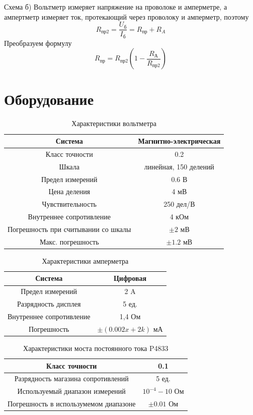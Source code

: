 \documentclass[a4paper,12pt]{article}
\begin{document}
Схема б) Вольтметр измеряет напряжение на проволоке и амперметре, а ампертметр измеряет ток, протекающий через проволоку и амперметр, поэтому
\begin{equation}
R_{\mbox{пр2}}=\frac{U_{\mbox{б}}}{I_{\mbox{б}}} = R_{\mbox{пр}}+R_A
\end{equation}
Преобразуем формулу
\begin{equation}
R_{\mbox{пр}}=R_{\mbox{пр2}} \left( 1-\frac{R_{\mbox{А}}}{R_{\mbox{пр2}}} \right)
\end{equation}

\section{Оборудование}

\begin{table}[H]
\caption{Характеристики вольтметра}
\begin{tabular}{|c|c|}
\hline
Система & Магнитно-электрическая \\
\hline
Класс точности & 0.2 \\
\hline
Шкала & линейная, 150 делений  \\
\hline
Предел измерений & 0.6 В \\
\hline
Цена деления & 4 мВ \\
\hline
Чувствительность & 250 дел/В \\
\hline
Внутреннее сопротивление & 4 кОм \\
\hline
Погрешность при считывании со шкалы & $\pm 2$ мВ \\
\hline
Макс. погрешность & $\pm1.2$ мВ \\
\hline
\end{tabular}
\end{table}

\begin{table}[H]
\caption{Характеристики амперметра}
\begin{tabular}{|c|c|}
\hline
Система & Цифровая \\
\hline
Предел измерений & 2 A \\
\hline
Разрядность дисплея & 5 ед. \\
\hline
Внутреннее сопротивление & 1,4 Ом \\
\hline
Погрешность & $\pm (0.002x+2k)$ мА \\
\hline
\end{tabular}
\end{table}

\begin{table}[H]
\caption{Характеристики моста постоянного тока P4833}
\begin{tabular}{|c|c|}
\hline
Класс точности & 0.1 \\
\hline
Разрядность магазина сопротивлений & 5 ед. \\
\hline
Используемый диапазон измерений & $10^{-4} - 10$ Ом \\
\hline
Погрешность в использумемом диапазоне & $\pm 0.01$ Ом \\
\hline
\end{tabular}
\end{table}
\end{document}
